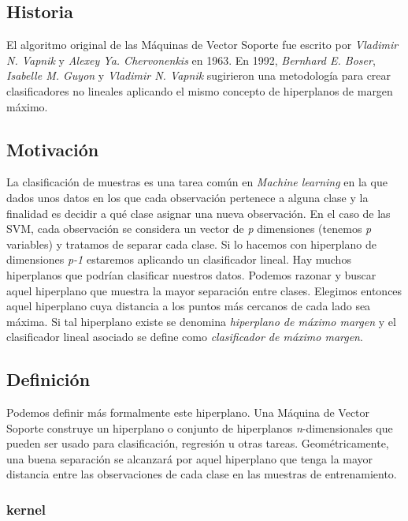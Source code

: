 \documentclass[12pt,spanish,a4paper]{article}
\numberwithin{equation}{section}
\begin{document}
\subsection{Historia}\label{historia}

El algoritmo original de las Máquinas de Vector Soporte fue escrito por
\emph{Vladimir N. Vapnik} y \emph{Alexey Ya. Chervonenkis} en 1963. En
1992, \emph{Bernhard E. Boser}, \emph{Isabelle M. Guyon} y
\emph{Vladimir N. Vapnik} sugirieron una metodología para crear
clasificadores no lineales aplicando el mismo concepto de hiperplanos de
margen máximo.

\subsection{Motivación}\label{motivacion}

La clasificación de muestras es una tarea común en \emph{Machine
learning} en la que dados unos datos en los que cada observación
pertenece a alguna clase y la finalidad es decidir a qué clase asignar
una nueva observación. En el caso de las SVM, cada observación se
considera un vector de \emph{p} dimensiones (tenemos \emph{p} variables)
y tratamos de separar cada clase. Si lo hacemos con hiperplano de
dimensiones \emph{p-1} estaremos aplicando un clasificador lineal. Hay
muchos hiperplanos que podrían clasificar nuestros datos. Podemos
razonar y buscar aquel hiperplano que muestra la mayor separación entre
clases. Elegimos entonces aquel hiperplano cuya distancia a los puntos
más cercanos de cada lado sea máxima. Si tal hiperplano existe se
denomina \emph{hiperplano de máximo margen} y el clasificador lineal
asociado se define como \emph{clasificador de máximo margen}.

\subsection{Definición}\label{definicion}

Podemos definir más formalmente este hiperplano. Una Máquina de Vector
Soporte construye un hiperplano o conjunto de hiperplanos
\emph{n}-dimensionales que pueden ser usado para clasificación,
regresión u otras tareas. Geométricamente, una buena separación se
alcanzará por aquel hiperplano que tenga la mayor distancia entre las
observaciones de cada clase en las muestras de entrenamiento.

\subsubsection{kernel}\label{kernel}
\end{document}
